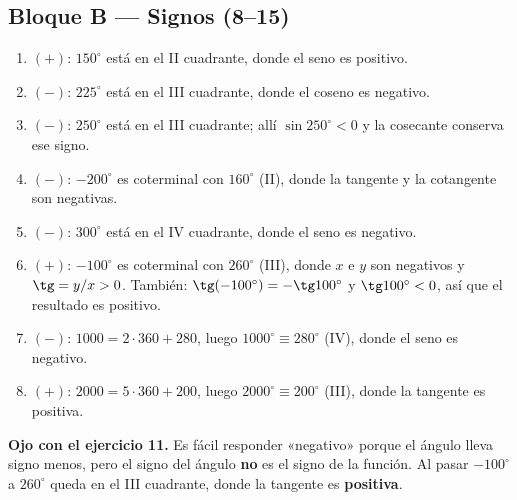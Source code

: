\documentclass[12pt, letterpaper]{article}
\providecommand{\sen}{\sin}
\begin{document}
\subsection*{Bloque B — Signos (8--15)}
\begin{enumerate}[leftmargin=*, label=\textbf{\arabic*.}, start=8]
  \item $(+)$: $150^\circ$ está en el II cuadrante, donde el seno es positivo.
  \item $(-)$: $225^\circ$ está en el III cuadrante, donde el coseno es negativo.
  \item $(-)$: $250^\circ$ está en el III cuadrante; allí $\sen 250^\circ<0$ y la cosecante conserva ese signo.
  \item $(-)$: $-200^\circ$ es coterminal con $160^\circ$ (II), donde la tangente y la cotangente son negativas.
  \item $(-)$: $300^\circ$ está en el IV cuadrante, donde el seno es negativo.
  \item $(+)$: $-100^\circ$ es coterminal con $260^\circ$ (III), donde $x$ e $y$ son negativos y $\tg=y/x>0$. También: $\tg(-100^\circ)=-\tg 100^\circ$ y $\tg 100^\circ<0$, así que el resultado es positivo.
  \item $(-)$: $1000=2\cdot360+280$, luego $1000^\circ\equiv280^\circ$ (IV), donde el seno es negativo.
  \item $(+)$: $2000=5\cdot360+200$, luego $2000^\circ\equiv200^\circ$ (III), donde la tangente es positiva.
\end{enumerate}

\begin{cuadroadvertencia}
  \small
  \textbf{Ojo con el ejercicio 11.} Es fácil responder «negativo» porque el
  ángulo lleva signo menos, pero el signo del ángulo \textbf{no} es el signo
  de la función. Al pasar $-100^\circ$ a $260^\circ$ queda en el III
  cuadrante, donde la tangente es \textbf{positiva}.
\end{cuadroadvertencia}
\end{document}
